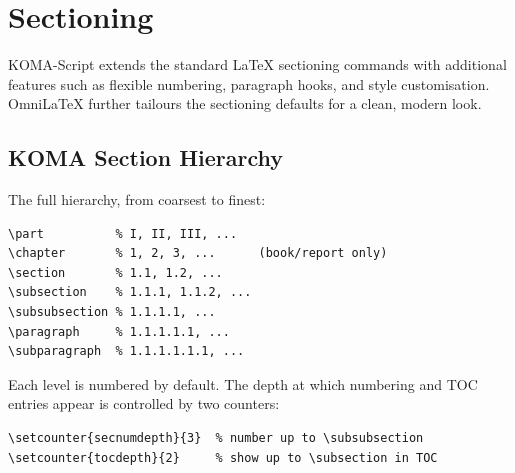 \chapter{Sectioning}
\label{ch:sectioning}

KOMA-Script extends the standard LaTeX sectioning commands with additional
features such as flexible numbering, paragraph hooks, and style customisation.
OmniLaTeX further tailours the sectioning defaults for a clean, modern look.

\section{KOMA Section Hierarchy}

The full hierarchy, from coarsest to finest:

\begin{verbatim}
\part          % I, II, III, ...
\chapter       % 1, 2, 3, ...      (book/report only)
\section       % 1.1, 1.2, ...
\subsection    % 1.1.1, 1.1.2, ...
\subsubsection % 1.1.1.1, ...
\paragraph     % 1.1.1.1.1, ...
\subparagraph  % 1.1.1.1.1.1, ...
\end{verbatim}

Each level is numbered by default.  The depth at which numbering and TOC
entries appear is controlled by two counters:

\begin{verbatim}
\setcounter{secnumdepth}{3}  % number up to \subsubsection
\setcounter{tocdepth}{2}     % show up to \subsection in TOC
\end{verbatim}


